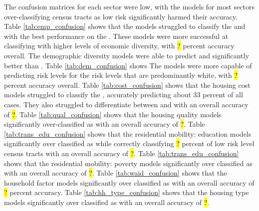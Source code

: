 The confusion matrices for each sector were low, with the models for most sectors over-classifying census tracts as low risk significantly harmed their accuracy. Table \ref{tab:emp_confusion} shows that the models struggled to classify the \mrls  and \hrls with the best performance on the \lrls. These models were more successful at classifying \cts with higher levels of economic diversity, with \hl{?} percent accuracy overall.  The demographic diversity models were able to predict \mrls and \lrls significantly better than \hrls.  Table \ref{tab:dem_confusion} shows The models were more capable of predicting \ct risk levels for the risk levels that are predominantly white, with \hl{?} percent accuracy overall.  Table \ref{tab:cost_confusion} shows that the housing cost models struggled to classify the \lrl \cts, accurately predicting about 33 percent of all cases. They also struggled to differentiate between \mrl and \hrl \cts with an overall accuracy of \hl{?}.  Table \ref{tab:qual_confusion} shows that the housing quality models significantly over-classified \cts as \lrl with an overall accuracy of \hl{?}.  Table \ref{tab:trans_edu_confusion} shows that the residential mobility: education models significantly over classified \cts as \lrl while correctly classifying \hl{?} percent of low risk level census tracts with an overall accuracy of \hl{?}. 
Table \ref{tab:trans_edu_confusion} shows that the residential mobility: poverty models significantly over classified \cts as \lrl with an overall accuracy of \hl{?}.  Table \ref{tab:waid_confusion} shows that the household factor models significantly over classified \cts as \lrl with an overall accuracy of \hl{?} percent accuracy. 
Table \ref{tab:hh_type_confusion} shows that the housing type models significantly over classified \cts as \lrl with an overall accuracy of \hl{?}.
 



\endinput